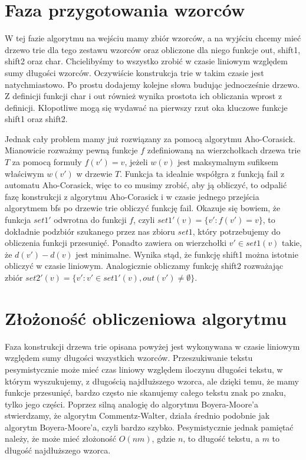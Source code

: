 \documentclass[a4paper,11pt]{article}
\begin{document}
\section{Faza przygotowania wzorców}
W tej fazie algorytmu na wejściu mamy zbiór wzorców, a na wyjściu chcemy mieć drzewo trie dla tego zestawu wzorców oraz obliczone dla niego funkcje out, shift1, shift2 oraz char. Chcielibyśmy to wszystko zrobić w czasie liniowym względem sumy długości wzorców. Oczywiście konstrukcja trie w takim czasie jest natychmiastowo. Po prostu dodajemy kolejne słowa budując jednocześnie drzewo. Z definicji funkcji char i out również wynika prostota ich obliczania wprost z definicji. Kłopotliwe mogą się wydawać na pierwszy rzut oka kluczowe funkcje shift1 oraz shift2.

Jednak cały problem mamy już rozwiązany za pomocą algorytmu Aho-Corasick. Mianowicie rozważmy pewną funkcje $f$ zdefiniowaną na wierzchołkach drzewa trie $T$ za pomocą formuły $f(v') = v$, jeżeli $w(v)$ jest maksymalnym sufiksem właściwym $w(v')$ w drzewie $T$. Funkcja ta idealnie współgra z funkcją fail z automatu Aho-Corasick, więc to co musimy zrobić, aby ją obliczyć, to odpalić fazę konstrukcji z algorytmu Aho-Corasick i w czasie jednego przejścia algorytmem bfs po drzewie trie obliczyć funkcję fail. Okazuje się bowiem, że funkcja $set1'$ odwrotna do funkcji $f$, czyli $set1'(v) = \{v' : f(v')=v \}$, to dokładnie podzbiór szukanego przez nas zbioru $set1$, który potrzebujemy do obliczenia funkcji przesunięć. Ponadto zawiera on wierzchołki $v' \in set1(v)$ takie, że $d(v')-d(v)$ jest minimalne. Wynika stąd, że funkcję shift1 można istotnie obliczyć w czasie liniowym. Analogicznie obliczamy funkcję shift2 rozważając zbiór $set2'(v) = \{ v' : v' \in set1'(v), out(v') \not = \emptyset\}$. 

\section{Złożoność obliczeniowa algorytmu}
Faza konstrukcji drzewa trie opisana powyżej jest wykonywana w czasie liniowym względem sumy długości wszystkich wzorców. Przeszukiwanie tekstu pesymistycznie może mieć czas liniowy względem iloczynu długości tekstu, w którym wyszukujemy, z długością najdłuższego wzorca, ale dzięki temu, że mamy funkcje przesunięć, bardzo często nie skanujemy całego tekstu znak po znaku, tylko jego części. Poprzez silną analogię do algorytmu Boyera-Moore'a stwierdzamy, że algorytm Commentz-Walter, działa średnio podobnie jak algorytm Boyera-Moore'a, czyli bardzo szybko. Pesymistycznie jednak pamiętać należy, że może mieć złożoność $O(nm)$, gdzie $n$, to długość tekstu, a $m$ to długość najdłuższego wzorca.
\end{document}
